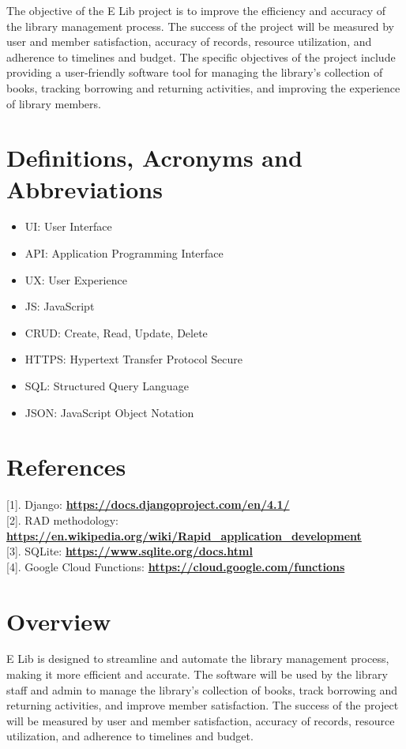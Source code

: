 The objective of the E Lib project is to improve the efficiency and accuracy of the library management process. The success of the project will be measured by user and member satisfaction, accuracy of records, resource utilization, and adherence to timelines and budget. The specific objectives of the project include providing a user-friendly software tool for managing the library's collection of books, tracking borrowing and returning activities, and improving the experience of library members.





\section{Definitions, Acronyms and Abbreviations}

\begin{itemize}
    \item UI: User Interface

    
    \item API: Application Programming Interface
    
    \item UX: User Experience
    
    \item JS: JavaScript
    
    \item CRUD: Create, Read, Update, Delete
    
    \item HTTPS: Hypertext Transfer Protocol Secure
    
    \item SQL: Structured Query Language
    
    \item JSON: JavaScript Object Notation
\end{itemize}

\section{References}
        [1]. Django: 
        \textbf{\url{https://docs.djangoproject.com/en/4.1/}} \\[1pt]
        [2]. RAD methodology: 
     \textbf{\url{https://en.wikipedia.org/wiki/Rapid_application_development}} \\ [1pt]
      [3]. SQLite: 
        \textbf{\url{https://www.sqlite.org/docs.html}} \\[1pt]
        [4]. Google Cloud Functions: 
        \textbf{\url{ https://cloud.google.com/functions}} \\[1pt]

        
\section{Overview}
E Lib is designed to streamline and automate the library management process, making it more efficient and accurate. The software will be used by the library staff and admin to manage the library's collection of books, track borrowing and returning activities, and improve member satisfaction. The success of the project will be measured by user and member satisfaction, accuracy of records, resource utilization, and adherence to timelines and budget.